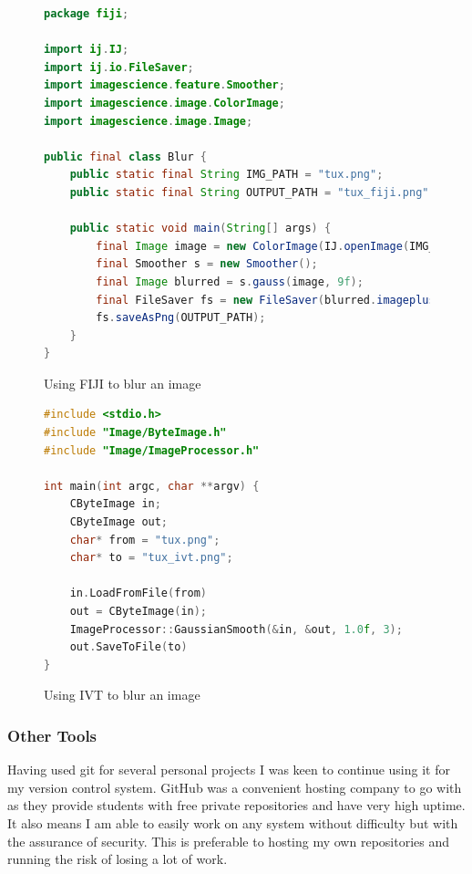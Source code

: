 \documentclass[11pt,fleqn,twoside]{article}
\begin{document}
\begin{figure}[p]
\begin{lstlisting}[language=Java]
package fiji;

import ij.IJ;
import ij.io.FileSaver;
import imagescience.feature.Smoother;
import imagescience.image.ColorImage;
import imagescience.image.Image;

public final class Blur {
	public static final String IMG_PATH = "tux.png";
	public static final String OUTPUT_PATH = "tux_fiji.png";

	public static void main(String[] args) {
		final Image image = new ColorImage(IJ.openImage(IMG_PATH));
		final Smoother s = new Smoother();
		final Image blurred = s.gauss(image, 9f);
		final FileSaver fs = new FileSaver(blurred.imageplus());
		fs.saveAsPng(OUTPUT_PATH);
	}
}
\end{lstlisting}
\caption{Using FIJI to blur an image}
\label{fig:fiji}
\end{figure}

\begin{figure}[p]
\begin{lstlisting}[language=C++]
#include <stdio.h>
#include "Image/ByteImage.h"
#include "Image/ImageProcessor.h"

int main(int argc, char **argv) {
	CByteImage in;
	CByteImage out;
	char* from = "tux.png";
	char* to = "tux_ivt.png";

	in.LoadFromFile(from)
	out = CByteImage(in);
	ImageProcessor::GaussianSmooth(&in, &out, 1.0f, 3);
	out.SaveToFile(to)
}
\end{lstlisting}
\caption{Using IVT to blur an image}
\label{fig:ivt}
\end{figure}


\subsubsection{Other Tools}
Having used git for several personal projects I was keen to continue using it for my version 
control system. GitHub was a convenient hosting company to go with as they provide students with 
free private repositories and have very high uptime. It also means I am able to easily work on any 
system without difficulty but with the assurance of security. This is preferable to hosting my own
repositories and running the risk of losing a lot of work.
\end{document}
